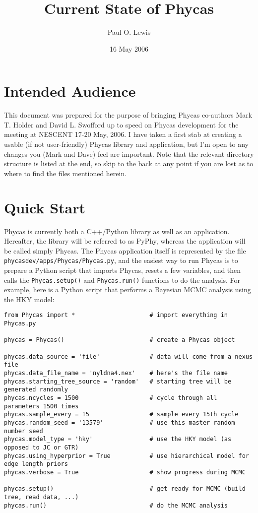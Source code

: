 \documentclass[10pt]{article}
\begin{document}
\title{Current State of Phycas}
\author{Paul O. Lewis} 
\date{16 May 2006}
\maketitle

\section{Intended Audience}

This document was prepared for the purpose of bringing Phycas co-authors Mark T. Holder and David L. Swofford up to speed on Phycas development for the meeting at NESCENT 17-20 May, 2006. I have taken a first stab at creating a usable (if not user-friendly) Phycas library and application, but I'm open to any changes you (Mark and Dave) feel are important. Note that the relevant directory structure is listed at the end, so skip to the back at any point if you are lost as to where to find the files mentioned herein.

\section{Quick Start}

Phycas is currently both a C++/Python library as well as an application. Hereafter, the library will be referred to as PyPhy, whereas the application will be called simply Phycas. The Phycas application itself is represented by the file {\tt phycasdev/apps/Phycas/Phycas.py}, and the easiest way to run Phycas is to prepare a Python script that imports Phycas, resets a few variables, and then calls the \verb+Phycas.setup()+ and \verb+Phycas.run()+ functions to do the analysis. For example, here is a Python script that performs a Bayesian MCMC analysis using the HKY model:

\begin{verbatim}
from Phycas import *                     # import everything in Phycas.py

phycas = Phycas()                        # create a Phycas object

phycas.data_source = 'file'              # data will come from a nexus file
phycas.data_file_name = 'nyldna4.nex'    # here's the file name
phycas.starting_tree_source = 'random'   # starting tree will be generated randomly
phycas.ncycles = 1500                    # cycle through all parameters 1500 times
phycas.sample_every = 15                 # sample every 15th cycle
phycas.random_seed = '13579'             # use this master random number seed
phycas.model_type = 'hky'                # use the HKY model (as opposed to JC or GTR)
phycas.using_hyperprior = True           # use hierarchical model for edge length priors
phycas.verbose = True                    # show progress during MCMC

phycas.setup()                           # get ready for MCMC (build tree, read data, ...)
phycas.run()                             # do the MCMC analysis
\end{verbatim}
\end{document}

